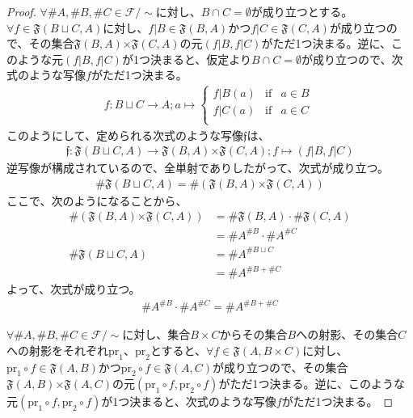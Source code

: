 \documentclass[dvipdfmx]{jsarticle}
\begin{document}
\begin{proof}
$\forall\# A,\# B,\# C \in \mathcal{F} /\sim $に対し、$B \cap C = \emptyset $が成り立つとする。$\forall f \in \mathfrak{F}(B \sqcup C,A)$に対し、$f|B \in \mathfrak{F}(B,A)$かつ$f|C \in \mathfrak{F}(C,A)$が成り立つので、その集合$\mathfrak{F}(B,A)\mathfrak{\times F}(C,A)$の元$\left( f|B,f|C \right)$がただ1つ決まる。逆に、このような元$\left( f|B,f|C \right)$が1つ決まると、仮定より$B \cap C = \emptyset $が成り立つので、次式のような写像$f$がただ1つ決まる。
\begin{align*}
f:B \sqcup C \rightarrow A;a \mapsto \left\{ \begin{matrix}
f|B(a) & {\mathrm{if}} & a \in B \\
f|C(a) & {\mathrm{if}} & a \in C \\
\end{matrix} \right.\ 
\end{align*}
このようにして、定められる次式のような写像$\mathfrak{f}$は、
\begin{align*}
\mathfrak{f:F}(B \sqcup C,A)\mathfrak{\rightarrow F}(B,A)\mathfrak{\times F}(C,A);f \mapsto \left( f|B,f|C \right)
\end{align*}
逆写像が構成されているので、全単射でありしたがって、次式が成り立つ。
\begin{align*}
\# {\mathfrak{F}(B \sqcup C,A)} = \# \left( \mathfrak{F}(B,A)\mathfrak{\times F}(C,A) \right)
\end{align*}
ここで、次のようになることから、
\begin{align*}
\# \left( \mathfrak{F}(B,A)\mathfrak{\times F}(C,A) \right) &= \# {\mathfrak{F}(B,A)} \cdot \# {\mathfrak{F}(C,A)}\\
&= {\# A}^{\# B} \cdot {\# A}^{\# C}\\
\# {\mathfrak{F}(B \sqcup C,A)} &= {\# A}^{\# {B \sqcup C}}\\
&= {\# A}^{\# B + \# C}
\end{align*}
よって、次式が成り立つ。
\begin{align*}
{\# A}^{\# B} \cdot {\# A}^{\# C} = {\# A}^{\# B + \# C}
\end{align*}\par
$\forall\# A,\# B,\# C \in \mathcal{F} /\sim $に対し、集合$B \times C$からその集合$B$への射影、その集合$C$への射影をそれぞれ${\mathrm{pr}}_{1}$、${\mathrm{pr}}_{2}$とすると、$\forall f \in \mathfrak{F}(A,B \times C)$に対し、${\mathrm{pr}}_{1} \circ f \in \mathfrak{F}(A,B)$かつ${\mathrm{pr}}_{2} \circ f\in \mathfrak{F}(A,C)$が成り立つので、その集合$\mathfrak{F}(A,B)\mathfrak{\times F}(A,C)$の元$\left( {\mathrm{pr}}_{1} \circ f,{\mathrm{pr}}_{2} \circ f \right)$がただ1つ決まる。逆に、このような元$\left( {\mathrm{pr}}_{1} \circ f,{\mathrm{pr}}_{2} \circ f \right)$が1つ決まると、次式のような写像$f$がただ1つ決まる。

\end{proof}
\end{document}
